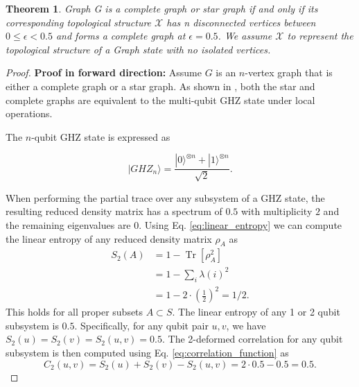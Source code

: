 \documentclass{article}
\newtheorem{theorem}{Theorem}
\DeclareMathOperator{\Tr}{Tr}
\newcommand{\ket}[1]{|#1\rangle}
\newcommand{\bra}[1]{\langle #1|}
\newcommand{\brackets}[1]{\left[ #1 \right]}
\newcommand{\trace}[1]{\Tr \brackets{ #1 }}
\begin{document}
\begin{theorem}
Graph G is a complete graph or star graph if and only if its corresponding topological structure $\mathcal{X}$ has n disconnected vertices between  $ 0 \leq \epsilon < 0.5 $ and forms a complete graph at  $ \epsilon = 0.5 $. We assume $\mathcal{X}$ to represent the topological structure of a Graph state with no isolated vertices.
\end{theorem}
\begin{proof}
    \textbf{Proof in forward direction:} Assume $ G $ is an $ n $-vertex graph that is either a complete graph or a star graph. As shown in \cite{hein2006entanglement}, both the star and complete graphs are equivalent to the multi-qubit GHZ state under local operations.

The $ n $-qubit GHZ state is expressed as


\begin{equation}
    \ket{GHZ_n} = \frac{\ket{0}^{\otimes n} + \ket{1}^{\otimes n}}{\sqrt{2}}.
\end{equation}




When performing the partial trace over any subsystem of a GHZ state, the resulting reduced density matrix has a spectrum of $0.5$ with multiplicity $2$ and the remaining eigenvalues are 0. Using Eq. \eqref{eq:linear_entropy} we can compute the linear entropy of any reduced density matrix $\rho_A$ as 
\begin{align}
    S_2(A) &= 1 - \trace{\rho_A^2} \\
    &= 1 - \sum_{i} \lambda(i)^2 \\
    &= 1 - 2 \cdot \left(\frac{1}{2} \right)^2 = 1/2.
\end{align}
This holds for all proper subsets \( A \subset S \). The linear entropy of any 1 or 2 qubit subsystem is \( 0.5 \). Specifically, for any qubit pair \( u, v \), we have \( S_2(u) = S_2(v) = S_2(u, v) = 0.5 \). The 2-deformed correlation for any qubit subsystem is then computed using Eq. \eqref{eq:correlation_function} as 
\begin{equation}
C_2(u, v) = S_2(u) + S_2(v) - S_2(u, v) = 2 \cdot 0.5 - 0.5 = 0.5.
\end{equation}


\end{proof}
\end{document}
